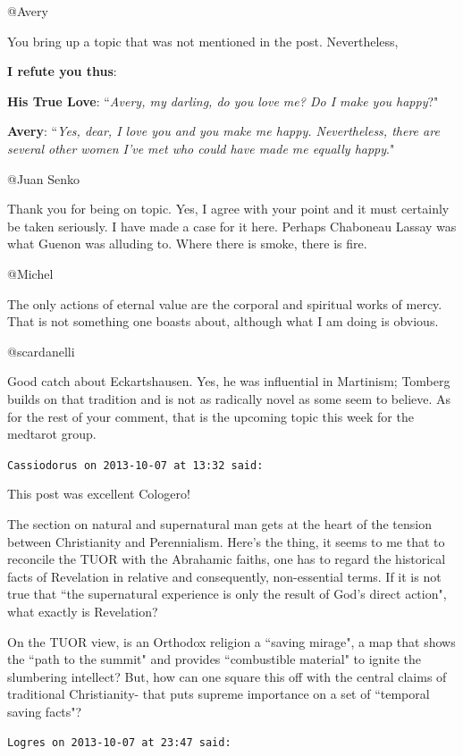 \begin{footnotesize}
\begin{sffamily}
@Avery

You bring up a topic that was not mentioned in the post. Nevertheless,

\textbf{I refute you thus}:

\textbf{His True Love}: ``\emph{Avery, my darling, do you love me? Do I make you happy}?"

\textbf{Avery}: ``\emph{Yes, dear, I love you and you make me happy. Nevertheless, there are several other women I've met who could have made me equally happy}."

@Juan Senko

Thank you for being on topic. Yes, I agree with your point and it must certainly be taken seriously. I have made a case for it here. Perhaps Chaboneau Lassay was what Guenon was alluding to. Where there is smoke, there is fire.

@Michel

The only actions of eternal value are the corporal and spiritual works of mercy. That is not something one boasts about, although what I am doing is obvious.

@scardanelli

Good catch about Eckartshausen. Yes, he was influential in Martinism; Tomberg builds on that tradition and is not as radically novel as some seem to believe. As for the rest of your comment, that is the upcoming topic this week for the medtarot group.


\hfill

\texttt{Cassiodorus on 2013-10-07 at 13:32 said: }

This post was excellent Cologero! 

The section on natural and supernatural man gets at the heart of the tension between Christianity and Perennialism. Here's the thing, it seems to me that to reconcile the TUOR with the Abrahamic faiths, one has to regard the historical facts of Revelation in relative and consequently, non-essential terms. If it is not true that ``the supernatural experience is only the result of God's direct action", what exactly is Revelation? 

On the TUOR view, is an Orthodox religion a ``saving mirage", a map that shows the ``path to the summit" and provides ``combustible material" to ignite the slumbering intellect? But, how can one square this off with the central claims of traditional Christianity- that puts supreme importance on a set of ``temporal saving facts"?


\hfill

\texttt{Logres on 2013-10-07 at 23:47 said: }


\end{sffamily}
\end{footnotesize}
